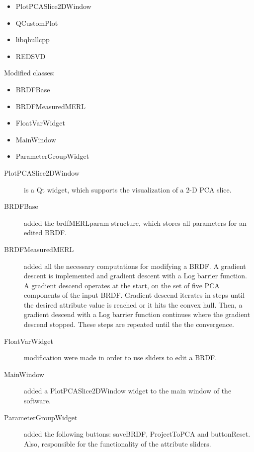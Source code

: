 \documentclass{article}
\begin{document}
\begin{itemize}
\item PlotPCASlice2DWindow
\item QCustomPlot \cite{qCustomPlot}
\item libqhullcpp \cite{qhull}
\item REDSVD \cite{redsvd}
\end{itemize}

\begin{flushleft} Modified classes:\end{flushleft}

\begin{itemize}
\item BRDFBase
\item BRDFMeasuredMERL 
\item FloatVarWidget
\item MainWindow
\item ParameterGroupWidget
\end{itemize}


\begin{description}
\item[PlotPCASlice2DWindow\label{PlotPCASlice2DWindow}]{ is a Qt widget, which supports the visualization of a 2-D PCA slice.}
\item[BRDFBase\label{BRDFBase}]{ added the brdfMERLparam structure, which stores all parameters for an edited BRDF.  }
\item[BRDFMeasuredMERL\label{BRDFMeasuredMERL}]{ added all the necessary computations for modifying a BRDF. A gradient descent is implemented and gradient descent with a Log barrier function. A gradient descend operates at the start, on the set of five PCA components of the input BRDF. Gradient descend iterates in steps until the desired attribute value is reached or it hits the convex hull. Then, a  gradient descend with a Log barrier function continues where the gradient descend stopped.  These steps are repeated until  the  the convergence. }
\item[FloatVarWidget\label{FloatVarWidget}]{modification were made in order to use sliders to edit  a BRDF. }
\item[MainWindow\label{MainWindow}]{added a  PlotPCASlice2DWindow widget to the main window of the software. }
\item[ParameterGroupWidget\label{ParameterGroupWidget}]{added  the following buttons: saveBRDF, ProjectToPCA and buttonReset. Also, responsible for the functionality of the attribute sliders.}


\end{description}
\end{document}
